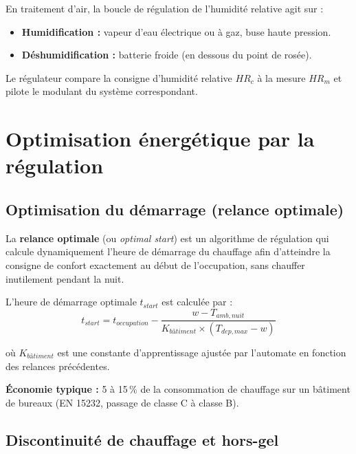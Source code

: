 En traitement d'air, la boucle de régulation de l'humidité relative agit sur :
\begin{itemize}
  \item \textbf{Humidification :} vapeur d'eau électrique ou à gaz, buse haute pression.
  \item \textbf{Déshumidification :} batterie froide (en dessous du point de rosée).
\end{itemize}

Le régulateur compare la consigne d'humidité relative $HR_c$ à la mesure $HR_m$ et pilote le modulant du système correspondant.

\section{Optimisation énergétique par la régulation}

\subsection{Optimisation du démarrage (relance optimale)}

\begin{definition}
  La \textbf{relance optimale} (ou \textit{optimal start}) est un algorithme de régulation qui calcule dynamiquement l'heure de démarrage du chauffage afin d'atteindre la consigne de confort exactement au début de l'occupation, sans chauffer inutilement pendant la nuit.
\end{definition}

L'heure de démarrage optimale $t_{start}$ est calculée par :
\begin{equation}
  t_{start} = t_{occupation} - \frac{w - T_{amb,nuit}}{K_{bâtiment} \times (T_{dep,max} - w)}
\end{equation}

où $K_{bâtiment}$ est une constante d'apprentissage ajustée par l'automate en fonction des relances précédentes.

\textbf{Économie typique :} 5 à 15\,\% de la consommation de chauffage sur un bâtiment de bureaux (EN 15232, passage de classe C à classe B).

\subsection{Discontinuité de chauffage et hors-gel}

